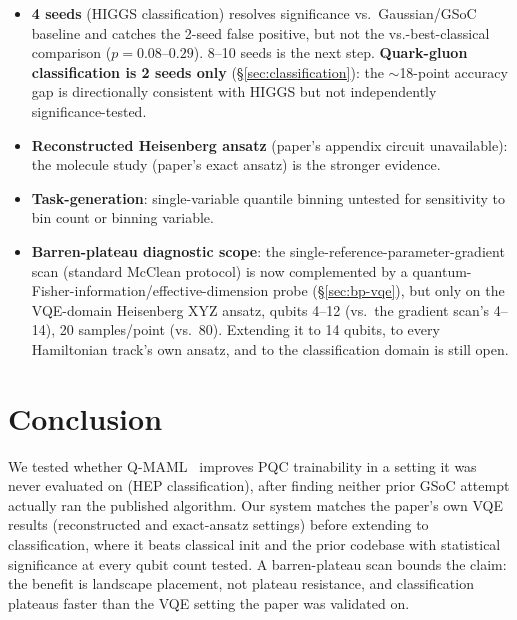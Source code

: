 \documentclass[11pt]{article}
\begin{document}
\begin{itemize}[nosep]
    for classification) below where plateaus are most severe on real hardware or GPU-scale simulation.
    \item \textbf{4 seeds} (HIGGS classification) resolves significance vs.\ Gaussian/GSoC baseline and
    catches the 2-seed false positive, but not the vs.-best-classical comparison ($p=0.08$--$0.29$). 8--10
    seeds is the next step. \textbf{Quark-gluon classification is 2 seeds only} (\S\ref{sec:classification}):
    the $\sim$18-point accuracy gap is directionally consistent with HIGGS but not independently
    significance-tested.
    \item \textbf{Reconstructed Heisenberg ansatz} (paper's appendix circuit unavailable): the molecule study
    (paper's exact ansatz) is the stronger evidence.
    \item \textbf{Task-generation}: single-variable quantile binning untested for sensitivity to bin count or
    binning variable.
    \item \textbf{Barren-plateau diagnostic scope}: the single-reference-parameter-gradient scan (standard
    McClean protocol) is now complemented by a quantum-Fisher-information/effective-dimension probe
    (\S\ref{sec:bp-vqe}), but only on the VQE-domain Heisenberg XYZ ansatz, qubits 4--12 (vs.\ the gradient
    scan's 4--14), 20 samples/point (vs.\ 80). Extending it to 14 qubits, to every Hamiltonian
    track's own ansatz, and to the classification domain is still open.
\end{itemize}

\section{Conclusion}

We tested whether Q-MAML~\citep{leeqmaml2025} improves PQC trainability in a setting it was never evaluated
on (HEP classification), after finding neither prior GSoC attempt actually ran the published algorithm. Our
system matches the paper's own VQE results (reconstructed and exact-ansatz settings) before extending to
classification, where it beats classical init and the prior codebase with statistical significance at every
qubit count tested. A barren-plateau scan bounds the claim: the benefit is landscape placement, not plateau
resistance, and classification plateaus faster than the VQE setting the paper was validated on.
\end{document}
